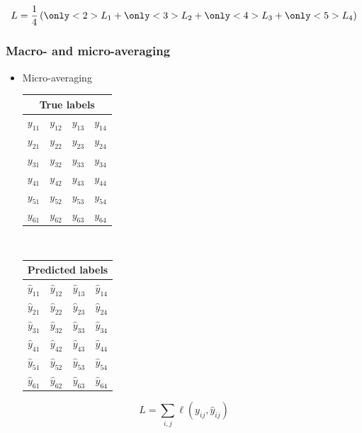 \documentclass[]{beamer}
\begin{document}
\begin{frame}
$$
L = \frac{1}{4} \left( {\only<2>{\color{putred}}L_1} + {\only<3>{\color{putred}}L_2} + {\only<4>{\color{putred}}L_3} + {\only<5>{\color{putred}}L_4} \right)
$$

\end{frame}




\begin{frame}
\frametitle{Macro- and micro-averaging}

\begin{itemize}
\item<1-> Micro-averaging

\begin{center}
\begin{tabular}{|c|c|c|c|}
\multicolumn{4}{c}{True labels} \\
\hline
\color{putred}$y_{11}$ & \color{putred}$y_{12}$ & \color{putred}$y_{13}$ & \color{putred}$y_{14}$ \\
\color{putred}$y_{21}$ & \color{putred}$y_{22}$ & \color{putred}$y_{23}$ & \color{putred}$y_{24}$ \\
\color{putred}$y_{31}$ & \color{putred}$y_{32}$ & \color{putred}$y_{33}$ & \color{putred}$y_{34}$ \\
\color{putred}$y_{41}$ & \color{putred}$y_{42}$ & \color{putred}$y_{43}$ & \color{putred}$y_{44}$ \\
\color{putred}$y_{51}$ & \color{putred}$y_{52}$ & \color{putred}$y_{53}$ & \color{putred}$y_{54}$ \\
\color{putred}$y_{61}$ & \color{putred}$y_{62}$ & \color{putred}$y_{63}$ & \color{putred}$y_{64}$ \\
\hline
\end{tabular}
$\quad$
\begin{tabular}{|c|c|c|c|}
\multicolumn{4}{c}{Predicted labels} \\
\hline
\color{putred}$\hat{y}_{11}$ & \color{putred}$\hat{y}_{12}$ & \color{putred}$\hat{y}_{13}$ & \color{putred}$\hat{y}_{14}$ \\
\color{putred}$\hat{y}_{21}$ & \color{putred}$\hat{y}_{22}$ & \color{putred}$\hat{y}_{23}$ & \color{putred}$\hat{y}_{24}$ \\
\color{putred}$\hat{y}_{31}$ & \color{putred}$\hat{y}_{32}$ & \color{putred}$\hat{y}_{33}$ & \color{putred}$\hat{y}_{34}$ \\
\color{putred}$\hat{y}_{41}$ & \color{putred}$\hat{y}_{42}$ & \color{putred}$\hat{y}_{43}$ & \color{putred}$\hat{y}_{44}$ \\
\color{putred}$\hat{y}_{51}$ & \color{putred}$\hat{y}_{52}$ & \color{putred}$\hat{y}_{53}$ & \color{putred}$\hat{y}_{54}$ \\
\color{putred}$\hat{y}_{61}$ & \color{putred}$\hat{y}_{62}$ & \color{putred}$\hat{y}_{63}$ & \color{putred}$\hat{y}_{64}$ \\
\hline
\end{tabular}
\end{center}
\end{itemize}

$$
L =  \sum_{i,j} \ell(y_{ij} , \hat{y}_{ij})
$$

\end{frame}
\end{document}
